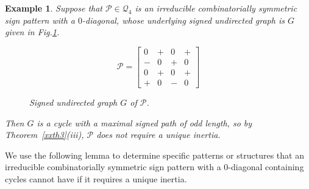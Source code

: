\documentclass[a4paper, 10pt]{article}
\newtheorem{eg}{Example}[section]
\numberwithin{equation}{section}
\begin{document}
\begin{eg}\label{xxeg3.9} Suppose that $\mathcal{P}\in \mathcal{Q}_4$ is an irreducible combinatorially symmetric sign pattern with a $0$-diagonal, whose underlying signed undirected graph is $G$ given in Fig.\ref{xnfig2}.
	
	\begin{figure}[H]
		\centering
		\begin{minipage}{.45\textwidth}
			\vspace{-1cm}
			\[
			\mathcal{P}=
			\begin{bmatrix}
				0 & + & 0 & + \\
				- & 0 & + & 0 \\
				0 & + & 0 & + \\
				+ & 0 & - & 0
			\end{bmatrix}
			\]
		\end{minipage}
		\hspace{0.05\textwidth}
		\begin{minipage}{.45\textwidth}
			\centering
			\tikzset{node distance=1cm}
			\caption{Signed undirected graph $ G$ of $\mathcal{P}$.}
			\label{xnfig2}
		\end{minipage}
	\end{figure}
	Then $G$ is a cycle with a maximal signed path of odd length, so by Theorem~\ref{xxth3}(iii), $\mathcal{P}$ does not require a unique inertia.
\end{eg}





We use the following lemma to determine specific patterns or structures that an irreducible combinatorially symmetric sign pattern with a $0$-diagonal containing cycles cannot have if it requires a unique inertia.

\end{document}
